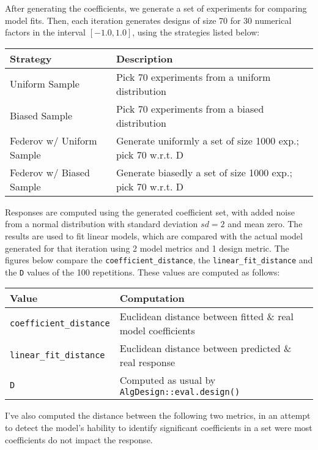 \documentclass[11pt]{article}
\begin{document}
After generating the coefficients, we generate a set of experiments for
comparing model fits. Then, each iteration generates designs of size 70 for 30
numerical factors in the interval \([-1.0, 1.0]\), using the strategies listed
below:

\begin{center}
\begin{tabular}{p{}p{}}
Strategy & Description\\
\hline
Uniform Sample & Pick 70 experiments from a uniform distribution\\
Biased Sample & Pick 70 experiments from a biased distribution\\
Federov w/ Uniform Sample & Generate uniformly a set of size 1000 exp.; pick 70 w.r.t. D\\
Federov w/ Biased Sample & Generate biasedly a set of size 1000 exp.; pick 70 w.r.t. D\\
\end{tabular}
\end{center}

Responses are computed using the generated coefficient set, with added noise
from a normal distribution with standard deviation \(sd = 2\) and mean zero. The
results are used to fit linear models, which are compared with the actual model
generated for that iteration using 2 model metrics and 1 design metric. The
figures below compare the \texttt{coefficient\_distance}, the \texttt{linear\_fit\_distance} and
the \texttt{D} values of the 100 repetitions. These values are computed as follows:

\begin{center}
\begin{tabular}{ll}
Value & Computation\\
\hline
\texttt{coefficient\_distance} & Euclidean distance between fitted \& real model coefficients\\
\texttt{linear\_fit\_distance} & Euclidean distance between predicted \& real response\\
\texttt{D} & Computed as usual by \texttt{AlgDesign::eval.design()}\\
\end{tabular}
\end{center}

I've also computed the distance between the following two metrics, in an attempt
to detect the model's hability to identify significant coefficients in a set
were most coefficients do not impact the response.
\end{document}
